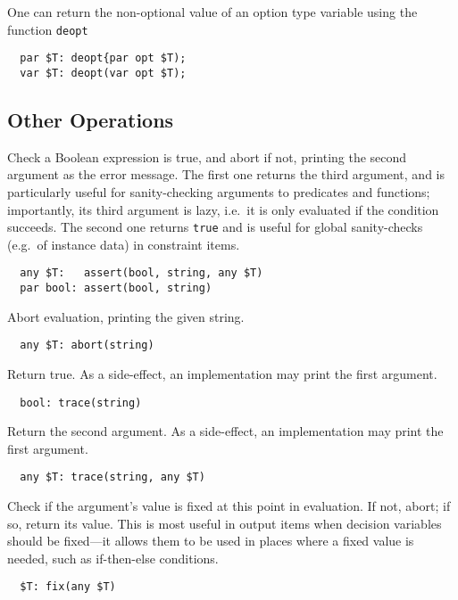 \documentclass[10pt]{scrartcl}
\newcommand{\pjs}[1]{\textcolor{blue}{PJS:#1}}
\begin{document}
One can return the non-optional value of an option type variable using the
function \texttt{deopt}
\begin{verbatim}
  par $T: deopt{par opt $T);
  var $T: deopt(var opt $T);
\end{verbatim}

\subsection{Other Operations}
     \label{Other Operations}
\builtin{}
Check a Boolean expression is true, and abort if not, printing the second
argument as the error message.  The first one returns the third argument, and
is particularly useful for sanity-checking arguments to predicates and
functions;  importantly, its third argument is lazy, i.e.~it is only evaluated
if the condition succeeds.  The second one returns \texttt{true} and is useful
for global sanity-checks (e.g.~of instance data) in constraint items.
\begin{verbatim}
  any $T:   assert(bool, string, any $T)
  par bool: assert(bool, string)
\end{verbatim}

\builtin{}
Abort evaluation, printing the given string.
\begin{verbatim}
  any $T: abort(string)
\end{verbatim}

\builtin{}
Return true. As a side-effect, an implementation may print the first argument.
\begin{verbatim}
  bool: trace(string)
\end{verbatim}

\builtin{}
Return the second argument.
As a side-effect, an implementation may print the first argument.
\begin{verbatim}
  any $T: trace(string, any $T)
\end{verbatim}

\builtin{}
Check if the argument's value is fixed at this point in evaluation.  If not,
abort; if so, return its value.  This is most useful in output items when
decision variables should be fixed---it allows them to be used in places
where a fixed value is needed, such as if-then-else conditions.
\begin{verbatim}
  $T: fix(any $T)
\end{verbatim}
\end{document}
